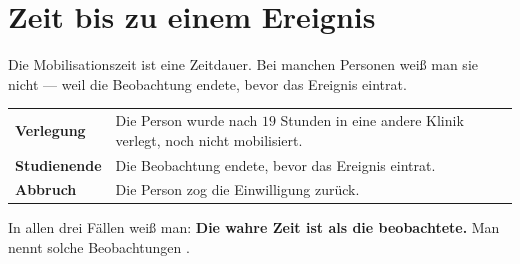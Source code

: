 \begin{warnung}
\begin{center}
\begin{minipage}{0.88\textwidth}
\end{minipage}
\end{center}
\end{warnung}

\section{Zeit bis zu einem Ereignis}

\begin{merksatz}
Die Mobilisationszeit ist eine Zeitdauer. Bei manchen Personen weiß man sie nicht --- weil die Beobachtung endete, bevor das Ereignis eintrat.

\begin{center}
\renewcommand{\arraystretch}{1.5}
\begin{tabular}{@{}P{2.6cm}P{6.0cm}@{}}
\toprule
\textbf{Verlegung} & Die Person wurde nach $19$ Stunden in eine andere Klinik verlegt, noch nicht mobilisiert.\\
\textbf{Studienende} & Die Beobachtung endete, bevor das Ereignis eintrat.\\
\textbf{Abbruch} & Die Person zog die Einwilligung zurück.\\
\bottomrule
\end{tabular}
\end{center}

\begin{center}
\begin{minipage}{0.9\textwidth}
In allen drei Fällen weiß man: \textbf{Die wahre Zeit ist  als die beobachtete.} Man nennt solche Beobachtungen .
\end{minipage}
\end{center}
\end{merksatz}

